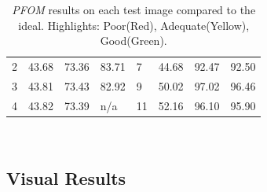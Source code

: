 \documentclass[9pt]{beamer}
\begin{document}
\begin{frame}
\begin{table}
\begin{center}
{\begin{tabular}{l l  l l| l l l l}
              2     &	43.68	 &73.36	&	\cellcolor{yellow} 83.71	& 7	&	44.68	& 92.47	&	 92.50\\
              3     &	\cellcolor{red}43.81	 &	\cellcolor{yellow}73.43	&	82.92	& 9	& 50.02		& 	\cellcolor{green}97.02	&  \cellcolor{green}96.46\\
              4     &	43.82	 &	73.39	&     n/a		& 11	&  \cellcolor{red}52.16 	& 	96.10	&   95.90\\\hline
              \end{tabular}}\\  
    \end{center}
    \caption{\emph{PFOM} results on each test image compared to the ideal. Highlights: Poor(Red), Adequate(Yellow), Good(Green). }
   
  \end{table}   
		
			


	\end{frame}
\subsection{Visual Results}
\end{document}
